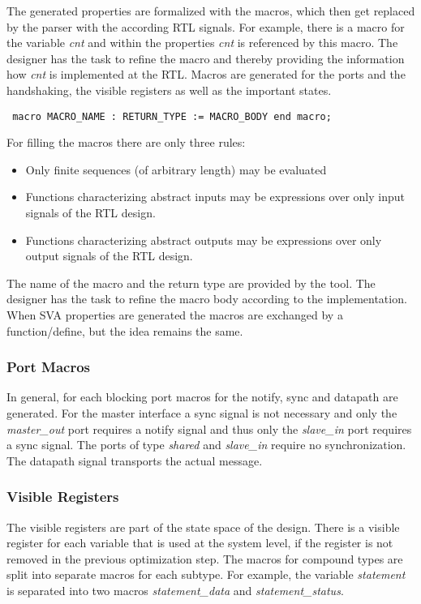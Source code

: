 The generated properties are formalized with the macros, which then get replaced by the parser with the according RTL signals.
For example, there is a macro for the variable \textit{cnt} and within the properties \textit{cnt} is referenced by this macro. 
The designer has the task to refine the macro and thereby providing the information how \textit{cnt} is implemented at the RTL. 
Macros are generated for the ports and the handshaking, the visible registers as well as the important states. 

\begin{verbatim} macro MACRO_NAME : RETURN_TYPE := MACRO_BODY end macro; 
\end{verbatim}
For filling the macros there are only three rules:
\begin{itemize}
\setlength\itemsep{0em}
\item Only finite sequences (of arbitrary length) may be evaluated
\item Functions characterizing abstract inputs may be expressions
over only input signals of the RTL design.
\item Functions characterizing abstract outputs may be expressions
over only output signals of the RTL design.
\end{itemize}
The name of the macro and the return type are provided by the tool. 
The designer has the task to refine the macro body according to the implementation.
When SVA properties are generated the macros are exchanged by a function/define, but the idea remains the same. 

\subsubsection{Port Macros}

In general, for each blocking port macros for the notify, sync and datapath are generated. 
For the master interface a sync signal is not necessary and only the \textit{master\_out} port requires a notify signal and thus only the \textit{slave\_in} port requires a sync signal.
The ports of type \textit{shared} and \textit{slave\_in} require no synchronization. 
The datapath signal transports the actual message.

\subsubsection{Visible Registers}

The visible registers are part of the state space of the design. 
There is a visible register for each variable that is used at the system level, if the register is not removed in the previous optimization step. 
The macros for compound types are split into separate macros for each subtype. 
For example, the variable \textit{statement} is separated into two macros \textit{statement\_data} and \textit{statement\_status}.

